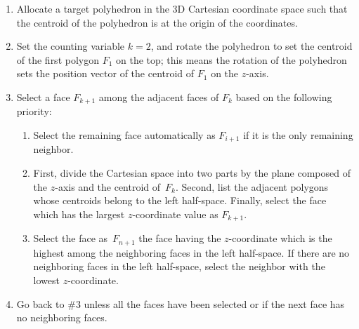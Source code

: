 \documentclass[]{interact}
\theoremstyle{plain}%
\theoremstyle{definition}
\theoremstyle{remark}
\begin{document}
\begin{enumerate}
\def\labelenumi{\arabic{enumi}.}
\item
  Allocate a target polyhedron in the 3D Cartesian coordinate space such that
  the centroid of the polyhedron is at the origin of
  the coordinates.
\item
  Set the counting variable \(k=2\), and rotate the polyhedron to set
  the centroid of the first polygon \(F_1\) on the top; this means the
  rotation of the polyhedron sets the position vector of the
  centroid of \(F_1\) on the \(z\)-axis.~
\item
  Select a face \(F_{k+1}\) among the adjacent faces of \(F_k\) based on the following priority: 
  \begin{enumerate}
  \item Select the remaining face automatically as \(F_{i+1}\) if it is the only remaining neighbor. 
  \item First, divide
  the Cartesian space into two parts by the plane composed of the \(z\)-axis and the centroid of~\(F_k\). Second, list the adjacent
  polygons whose centroids belong to the left half-space. Finally,
  select the face which has the largest \(z\)-coordinate value
  as \(F_{k+1}\).
  \item Select the face as~\(F_{n+1}\) the face having  the \(z\)-coordinate which is the
  highest among the neighboring faces in the left half-space. If there
  are no neighboring faces in the left half-space, select the neighbor with
  the lowest \(z\)-coordinate. ~
  \end{enumerate}
\item
  Go back to \#3 unless all the faces have been selected or if the next face has no
  neighboring faces.
\end{enumerate}
\end{document}
